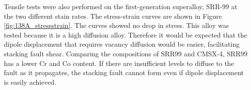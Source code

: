 \documentclass[a4paper,12pt,times,numbered,print,index]{Classes/PhDThesisPSnPDF}
\begin{document}
Tensile tests were also performed on the first-generation superalloy, SRR-99 at the two different stain rates. The stress-strain curves are shown in Figure \ref{fig:138A_stressstrain}. The curves showed no drop in stress. This alloy was tested because it is a high diffusion alloy. Therefore it would be expected that the dipole displacement that requires vacancy diffusion would be easier, facilitating stacking fault shear. Comparing the compositions of SRR99 and CMSX-4, SRR99 has a lower Cr and Co content. If there are insufficient levels to diffuse to the fault as it propagates, the stacking fault cannot form even if dipole displacement is easily achieved.\\



\end{document}
